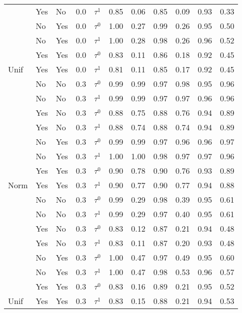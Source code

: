 \begin{tabular}[t]{lllrlrrrrrr}
 & Yes & No & 0.0 & $\tau^1$ & 0.85 & 0.06 & 0.85 & 0.09 & 0.93 & 0.33\\

 & No & Yes & 0.0 & $\tau^0$ & 1.00 & 0.27 & 0.99 & 0.26 & 0.95 & 0.50\\

 & No & Yes & 0.0 & $\tau^1$ & 1.00 & 0.28 & 0.98 & 0.26 & 0.96 & 0.52\\

 & Yes & Yes & 0.0 & $\tau^0$ & 0.83 & 0.11 & 0.86 & 0.18 & 0.92 & 0.45\\

\multirow{-8}{*}{\raggedright\arraybackslash Unif} & Yes & Yes & 0.0 & $\tau^1$ & 0.81 & 0.11 & 0.85 & 0.17 & 0.92 & 0.45\\
\cmidrule{1-11}
 & No & No & 0.3 & $\tau^0$ & 0.99 & 0.99 & 0.97 & 0.98 & 0.95 & 0.96\\

 & No & No & 0.3 & $\tau^1$ & 0.99 & 0.99 & 0.97 & 0.97 & 0.96 & 0.96\\

 & Yes & No & 0.3 & $\tau^0$ & 0.88 & 0.75 & 0.88 & 0.76 & 0.94 & 0.89\\

 & Yes & No & 0.3 & $\tau^1$ & 0.88 & 0.74 & 0.88 & 0.74 & 0.94 & 0.89\\

 & No & Yes & 0.3 & $\tau^0$ & 0.99 & 0.99 & 0.97 & 0.96 & 0.96 & 0.97\\

 & No & Yes & 0.3 & $\tau^1$ & 1.00 & 1.00 & 0.98 & 0.97 & 0.97 & 0.96\\

 & Yes & Yes & 0.3 & $\tau^0$ & 0.90 & 0.78 & 0.90 & 0.76 & 0.93 & 0.89\\

\multirow{-8}{*}{\raggedright\arraybackslash Norm} & Yes & Yes & 0.3 & $\tau^1$ & 0.90 & 0.77 & 0.90 & 0.77 & 0.94 & 0.88\\
\cmidrule{1-11}
 & No & No & 0.3 & $\tau^0$ & 0.99 & 0.29 & 0.98 & 0.39 & 0.95 & 0.61\\

 & No & No & 0.3 & $\tau^1$ & 0.99 & 0.29 & 0.97 & 0.40 & 0.95 & 0.61\\

 & Yes & No & 0.3 & $\tau^0$ & 0.83 & 0.12 & 0.87 & 0.21 & 0.94 & 0.48\\

 & Yes & No & 0.3 & $\tau^1$ & 0.83 & 0.11 & 0.87 & 0.20 & 0.93 & 0.48\\

 & No & Yes & 0.3 & $\tau^0$ & 1.00 & 0.47 & 0.97 & 0.49 & 0.95 & 0.60\\

 & No & Yes & 0.3 & $\tau^1$ & 1.00 & 0.47 & 0.98 & 0.53 & 0.96 & 0.57\\

 & Yes & Yes & 0.3 & $\tau^0$ & 0.83 & 0.16 & 0.89 & 0.21 & 0.95 & 0.52\\

\multirow{-8}{*}{\raggedright\arraybackslash Unif} & Yes & Yes & 0.3 & $\tau^1$ & 0.83 & 0.15 & 0.88 & 0.21 & 0.94 & 0.53\\
\bottomrule
\end{tabular}
